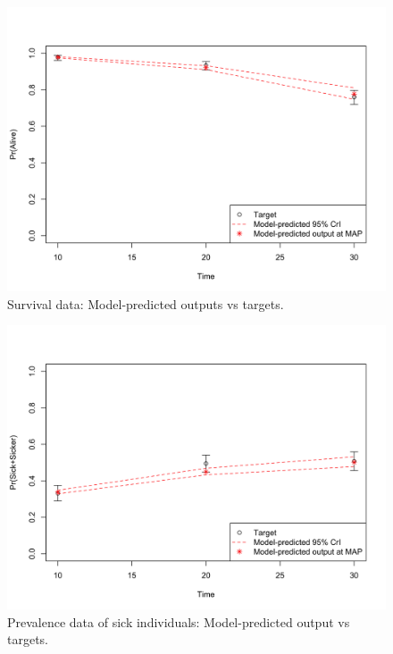 \documentclass[]{book}
\begin{document}
\begin{figure}

{\centering \includegraphics[width=1\linewidth]{../figs/04_posterior_vs_targets_survival} 

}

\caption{Survival data: Model-predicted outputs vs targets.}\label{fig:04-surv}
\end{figure}

\begin{figure}

{\centering \includegraphics[width=1\linewidth]{../figs/04_posterior_vs_targets_prevalence} 

}

\caption{Prevalence data of sick individuals: Model-predicted output vs targets.}\label{fig:04-prevalence}
\end{figure}
\end{document}
